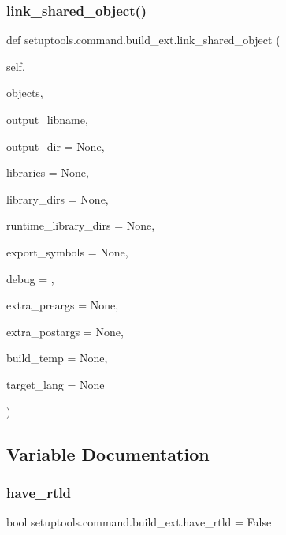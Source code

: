 \subsubsection{\texorpdfstring{link\+\_\+shared\+\_\+object()}{link\_shared\_object()}}
{\footnotesize\ttfamily def setuptools.\+command.\+build\+\_\+ext.\+link\+\_\+shared\+\_\+object (\begin{DoxyParamCaption}\item[{}]{self,  }\item[{}]{objects,  }\item[{}]{output\+\_\+libname,  }\item[{}]{output\+\_\+dir = {\ttfamily None},  }\item[{}]{libraries = {\ttfamily None},  }\item[{}]{library\+\_\+dirs = {\ttfamily None},  }\item[{}]{runtime\+\_\+library\+\_\+dirs = {\ttfamily None},  }\item[{}]{export\+\_\+symbols = {\ttfamily None},  }\item[{}]{debug = {},  }\item[{}]{extra\+\_\+preargs = {\ttfamily None},  }\item[{}]{extra\+\_\+postargs = {\ttfamily None},  }\item[{}]{build\+\_\+temp = {\ttfamily None},  }\item[{}]{target\+\_\+lang = {\ttfamily None} }\end{DoxyParamCaption})}



\subsection{Variable Documentation}
\mbox{\label{namespacesetuptools_1_1command_1_1build__ext_a72aec6a687c5be3341dc37d8b017c4c9}} 
\subsubsection{\texorpdfstring{have\+\_\+rtld}{have\_rtld}}
{\footnotesize\ttfamily bool setuptools.\+command.\+build\+\_\+ext.\+have\+\_\+rtld = False}


